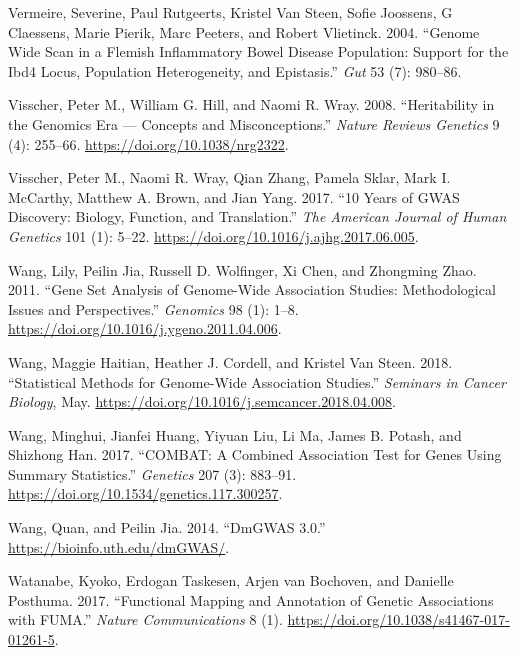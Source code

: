 \documentclass[
  11pt,
]{env/yjiao}
\newlength{\cslhangindent}
\newenvironment{cslreferences}%
  {\setlength{\parindent}{0pt}%
  \everypar{\setlength{\hangindent}{\cslhangindent}}\ignorespaces}%
  {\par}
\begin{document}
\begin{cslreferences}
\leavevmode\hypertarget{ref-vermeire2004genome}{}%
Vermeire, Severine, Paul Rutgeerts, Kristel Van Steen, Sofie Joossens, G Claessens, Marie Pierik, Marc Peeters, and Robert Vlietinck. 2004. ``Genome Wide Scan in a Flemish Inflammatory Bowel Disease Population: Support for the Ibd4 Locus, Population Heterogeneity, and Epistasis.'' \emph{Gut} 53 (7): 980--86.

\leavevmode\hypertarget{ref-visscher_heritability_2008}{}%
Visscher, Peter M., William G. Hill, and Naomi R. Wray. 2008. ``Heritability in the Genomics Era --- Concepts and Misconceptions.'' \emph{Nature Reviews Genetics} 9 (4): 255--66. \url{https://doi.org/10.1038/nrg2322}.

\leavevmode\hypertarget{ref-visscher_10_2017}{}%
Visscher, Peter M., Naomi R. Wray, Qian Zhang, Pamela Sklar, Mark I. McCarthy, Matthew A. Brown, and Jian Yang. 2017. ``10 Years of GWAS Discovery: Biology, Function, and Translation.'' \emph{The American Journal of Human Genetics} 101 (1): 5--22. \url{https://doi.org/10.1016/j.ajhg.2017.06.005}.

\leavevmode\hypertarget{ref-wang_gene_2011}{}%
Wang, Lily, Peilin Jia, Russell D. Wolfinger, Xi Chen, and Zhongming Zhao. 2011. ``Gene Set Analysis of Genome-Wide Association Studies: Methodological Issues and Perspectives.'' \emph{Genomics} 98 (1): 1--8. \url{https://doi.org/10.1016/j.ygeno.2011.04.006}.

\leavevmode\hypertarget{ref-wang_statistical_2018}{}%
Wang, Maggie Haitian, Heather J. Cordell, and Kristel Van Steen. 2018. ``Statistical Methods for Genome-Wide Association Studies.'' \emph{Seminars in Cancer Biology}, May. \url{https://doi.org/10.1016/j.semcancer.2018.04.008}.

\leavevmode\hypertarget{ref-wang_combat:_2017}{}%
Wang, Minghui, Jianfei Huang, Yiyuan Liu, Li Ma, James B. Potash, and Shizhong Han. 2017. ``COMBAT: A Combined Association Test for Genes Using Summary Statistics.'' \emph{Genetics} 207 (3): 883--91. \url{https://doi.org/10.1534/genetics.117.300257}.

\leavevmode\hypertarget{ref-dmgwas}{}%
Wang, Quan, and Peilin Jia. 2014. ``DmGWAS 3.0.'' \url{https://bioinfo.uth.edu/dmGWAS/}.

\leavevmode\hypertarget{ref-watanabe_functional_2017}{}%
Watanabe, Kyoko, Erdogan Taskesen, Arjen van Bochoven, and Danielle Posthuma. 2017. ``Functional Mapping and Annotation of Genetic Associations with FUMA.'' \emph{Nature Communications} 8 (1). \url{https://doi.org/10.1038/s41467-017-01261-5}.


\end{cslreferences}
\end{document}
